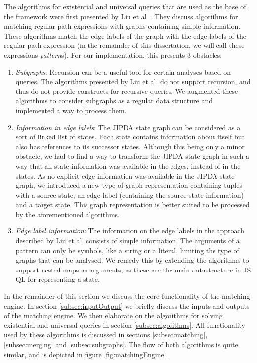 The algorithms for existential and universal queries that are used as the base of the framework were first presented by Liu et al~\cite{algoEngine}. They discuss algorithms for matching regular path expressions with graphs containing simple information. These algorithms match the edge labels of the graph with the edge labels of the regular path expression (in the remainder of this dissertation, we will call these expressions \textit{pattern}s). For our implementation, this presents 3 obstacles:
\begin{enumerate}
\item \textit{Subgraphs}: Recursion can be a useful tool for certain analyses based on queries. The algorithms presented by Liu et al. do not support recursion, and thus do not provide constructs for recursive queries. We augmented these algorithms to consider subgraphs as a regular data structure and implemented a way to process them.
\item \textit{Information in edge labels}: The JIPDA state graph can be considered as a sort of linked list of states. Each state contains information about itself but also has references to its successor states. Although this being only a minor obstacle, we had to find a way to transform the JIPDA state graph in such a way that all state information was available in the edges, instead of in the states. As no explicit edge information was available in the JIPDA state graph, we introduced a new type of graph representation containing tuples with a source state, an edge label (containing the source state information) and a target state. This graph representation is better suited to be processed by the aforementioned algorithms.
\item \textit{Edge label information}: The information on the edge labels in the approach described by Liu et al. consists of simple information. The arguments of a pattern can only be symbols, like a string or a literal, limiting the type of graphs that can be analysed. We remedy this by extending the algorithms to support nested maps as arguments, as these are the main datastructure in JS-QL for representing a state.
\end{enumerate}


In the remainder of this section we discuss the core functionality of the matching engine. In section \ref{subsec:inputOutput} we briefly discuss the inputs and outputs of the matching engine. We then elaborate on the algorithms for solving existential and universal queries in section \ref{subsec:algorithms}. All functionality used by these algorithms is discussed in sections \ref{subsec:matching}, \ref{subsec:merging} and \ref{subsec:subgraphs}. The flow of both algorithms is quite similar, and is depicted in figure \ref{fig:matchingEngine}.

